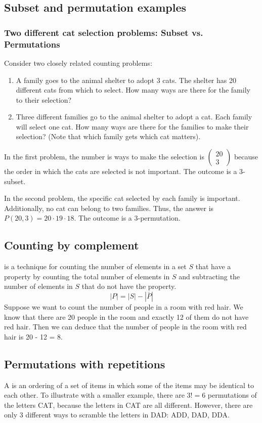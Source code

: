 \subsection{Subset and permutation examples}

\subsubsection*{Two different cat selection problems: Subset vs. Permutations}
Consider two closely related counting problems:
\begin{enumerate}
  \item A family goes to the animal shelter to adopt 3 cats. The shelter has 20 different cats from which to select. How many ways are there for the family to their selection?
  \item Three different families go to the animal shelter to adopt a cat. Each family will select one cat. How many ways are there for the families to make their selection? (Note that which family gets which cat matters).
\end{enumerate}
In the first problem, the number is ways to make the selection is $\begin{pmatrix}
    20 \\ 3
  \end{pmatrix}$ because the order in which the cats are selected is not important. The outcome is a 3-subset.

In the second problem, the specific cat selected by each family is important. Additionally, no cat can belong to two families. Thus, the answer is $P(20,3) = 20 \cdot 19 \cdot 18$. The outcome is a 3-permutation.

\subsection{Counting by complement}
 is a technique for counting the number of elements in a set $S$ that have a property by counting the total number of elements in $S$ and subtracting the number of elements in $S$ that do not have the property.
\[
  |P| = |S| - |\bar{P}|
\]
Suppose we want to count the number of people in a room with red hair. We know that there are 20 people in the room and exactly 12 of them do not have red hair. Then we can deduce that the number of people in the room with red hair is 20 - 12 = 8.

\subsection{Permutations with repetitions}
A  is an ordering of a set of items in which some of the items may be identical to each other. To illustrate with a smaller example, there are $3! = 6$ permutations of the letters CAT, because the letters in CAT are all different. However, there are only 3 different ways to scramble the letters in DAD: ADD, DAD, DDA.

